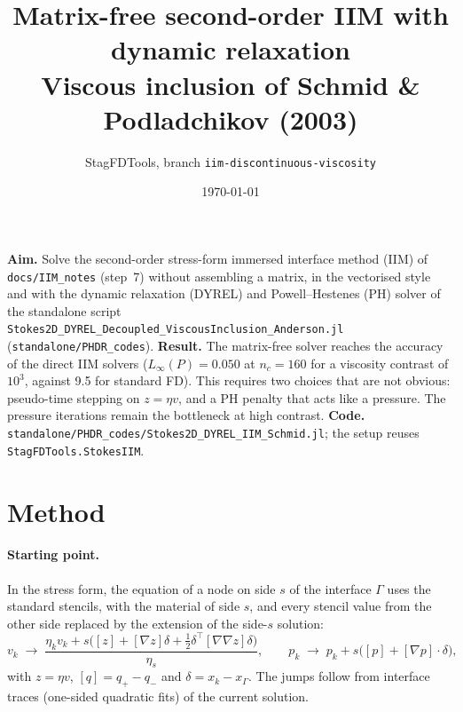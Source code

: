 \documentclass[11pt,a4paper]{article}
\title{Matrix-free second-order IIM with dynamic relaxation\\[2pt]
\large Viscous inclusion of Schmid \& Podladchikov (2003)}
\author{StagFDTools, branch \texttt{iim-discontinuous-viscosity}}
\date{\today}
\newcommand{\code}[1]{\texttt{#1}}
\begin{document}
\maketitle

\noindent\textbf{Aim.} Solve the second-order stress-form immersed interface method (IIM) of
\code{docs/\allowbreak IIM\_notes} (step~7) without assembling a matrix, in the vectorised style and with
the dynamic relaxation (DYREL) and Powell--Hestenes (PH) solver of the standalone script
\code{Stokes2D\_DYREL\_Decoupled\_ViscousInclusion\_Anderson.jl} (\code{standalone/\allowbreak PHDR\_codes}).
\textbf{Result.} The matrix-free solver reaches the accuracy of the direct IIM solvers
($L_\infty(P)=0.050$ at $n_c=160$ for a viscosity contrast of $10^3$, against 9.5 for
standard FD). This requires two choices that are not obvious: pseudo-time stepping on
$z=\eta v$, and a PH penalty that acts like a pressure. The pressure iterations remain the
bottleneck at high contrast.
\textbf{Code.} \code{standalone/\allowbreak PHDR\_codes/\allowbreak Stokes2D\_DYREL\_IIM\_Schmid.jl}; the setup reuses
\code{StagFDTools.StokesIIM}.

\section{Method}

\paragraph{Starting point.} In the stress form, the equation of a node on side $s$ of the
interface $\Gamma$ uses the standard stencils, with the material of side $s$, and every stencil
value from the other side replaced by the extension of the side-$s$ solution:
\[
v_k\;\to\;\frac{\eta_kv_k+s\bigl([z]+[\nabla z]\delta+\tfrac12\delta^\top[\nabla\nabla z]\delta\bigr)}{\eta_s},
\qquad
p_k\;\to\;p_k+s\bigl([p]+[\nabla p]\cdot\delta\bigr),
\]
with $z=\eta v$, $[q]=q_+-q_-$ and $\delta=x_k-x_\Gamma$. The jumps follow from interface traces
(one-sided quadratic fits) of the current solution.
\end{document}
